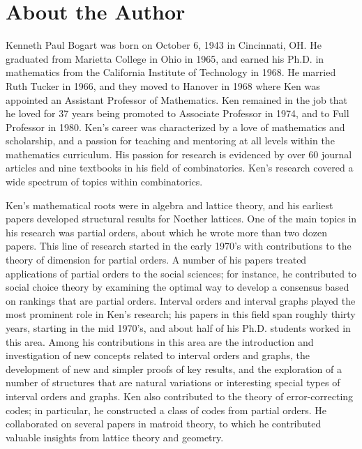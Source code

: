 \documentclass[10pt,]{book}
\theoremstyle{plain}
\theoremstyle{definition}
\theoremstyle{definition}
\numberwithin{equation}{chapter}
\begin{document}
\chapter*{About the Author}
\hypertarget{p-1}{}%
Kenneth Paul Bogart was born on October 6, 1943 in Cincinnati, OH. He graduated from Marietta College in Ohio in 1965, and earned his Ph.D. in mathematics from the California Institute of Technology in 1968. He married Ruth Tucker in 1966, and they moved to Hanover in 1968 where Ken was appointed an Assistant Professor of Mathematics. Ken remained in the job that he loved for 37 years being promoted to Associate Professor in 1974, and to Full Professor in 1980. Ken's career was characterized by a love of mathematics and scholarship, and a passion for teaching and mentoring at all levels within the mathematics curriculum. His passion for research is evidenced by over 60 journal articles and nine textbooks in his field of combinatorics. Ken's research covered a wide spectrum of topics within combinatorics.%
\par
\hypertarget{p-2}{}%
Ken's mathematical roots were in algebra and lattice theory, and his earliest papers developed structural results for Noether lattices. One of the main topics in his research was partial orders, about which he wrote more than two dozen papers. This line of research started in the early 1970's with contributions to the theory of dimension for partial orders. A number of his papers treated applications of partial orders to the social sciences; for instance, he contributed to social choice theory by examining the optimal way to develop a consensus based on rankings that are partial orders. Interval orders and interval graphs played the most prominent role in Ken's research; his papers in this field span roughly thirty years, starting in the mid 1970's, and about half of his Ph.D. students worked in this area. Among his contributions in this area are the introduction and investigation of new concepts related to interval orders and graphs, the development of new and simpler proofs of key results, and the exploration of a number of structures that are natural variations or interesting special types of interval orders and graphs. Ken also contributed to the theory of error-correcting codes; in particular, he constructed a class of codes from partial orders. He collaborated on several papers in matroid theory, to which he contributed valuable insights from lattice theory and geometry.%
\par
\hypertarget{p-3}{}%
\end{document}

